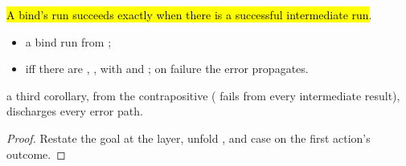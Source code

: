 \begin{lemma}
\label{lem:Erasure-run_bind_ok}
\leanok
{}
 \hl{A bind's run succeeds exactly when there is a successful intermediate run}.
\begin{itemize}
\item {} a bind  run from ;
\item {}  iff there are , ,
 with  and
; on failure the error propagates.
\end{itemize}
 a third corollary, from the contrapositive ( fails from every intermediate
result), discharges every error path.
\end{lemma}
\begin{proof}
\leanok
{}
 Restate the goal at the  layer, unfold , and case on the first
action's outcome.
\end{proof}

